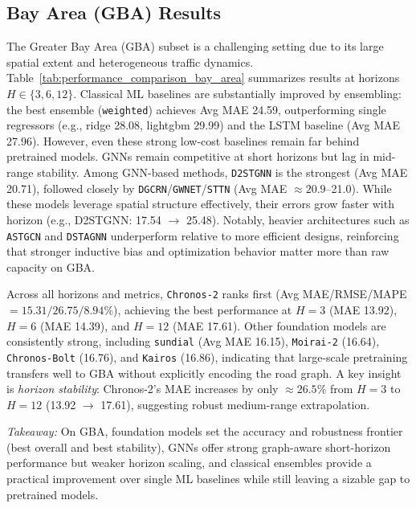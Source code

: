 \documentclass[10pt]{article}
\begin{document}
\subsection{ Bay Area (GBA) Results}
\label{sec:results_bay_area}

The Greater Bay Area (GBA) subset is a challenging setting due to its large spatial extent and heterogeneous
traffic dynamics. Table~\ref{tab:performance_comparison_bay_area} summarizes results at horizons
$H\in\{3,6,12\}$. Classical ML baselines are substantially improved by ensembling: the best ensemble (\texttt{weighted}) achieves Avg MAE 24.59, outperforming single regressors (e.g., ridge 28.08, lightgbm 29.99) and the LSTM
baseline (Avg MAE 27.96). However, even these strong low-cost baselines remain far behind pretrained models. GNNs remain competitive at short horizons but lag in mid-range stability. Among GNN-based methods, \texttt{D2STGNN} is the strongest (Avg MAE 20.71), followed closely by
\texttt{DGCRN}/\texttt{GWNET}/\texttt{STTN} (Avg MAE $\approx 20.9$--21.0). While these models leverage spatial
structure effectively, their errors grow faster with horizon (e.g., D2STGNN: 17.54 $\rightarrow$ 25.48).
Notably, heavier architectures such as \texttt{ASTGCN} and \texttt{DSTAGNN} underperform relative to more
efficient designs, reinforcing that stronger inductive bias and optimization behavior matter more than raw
capacity on GBA.

Across all horizons and metrics, \texttt{Chronos-2} ranks first (Avg MAE/RMSE/MAPE $=15.31/26.75/8.94\%$),
achieving the best performance at $H=3$ (MAE 13.92), $H=6$ (MAE 14.39), and $H=12$ (MAE 17.61).
Other foundation models are consistently strong, including \texttt{sundial} (Avg MAE 16.15),
\texttt{Moirai-2} (16.64), \texttt{Chronos-Bolt} (16.76), and \texttt{Kairos} (16.86), indicating that
large-scale pretraining transfers well to GBA without explicitly encoding the road graph.
A key insight is \emph{horizon stability}: Chronos-2’s MAE increases by only $\approx 26.5\%$ from $H=3$ to
$H=12$ (13.92 $\rightarrow$ 17.61), suggesting robust medium-range extrapolation.



\begin{keydiscovery1}
\textit{Takeaway:}
On GBA, foundation models set the accuracy and robustness frontier (best overall and best stability), GNNs offer strong graph-aware short-horizon performance but weaker horizon scaling, and classical ensembles provide
a practical improvement over single ML baselines while still leaving a sizable gap to pretrained models.
\end{keydiscovery1}
\end{document}
